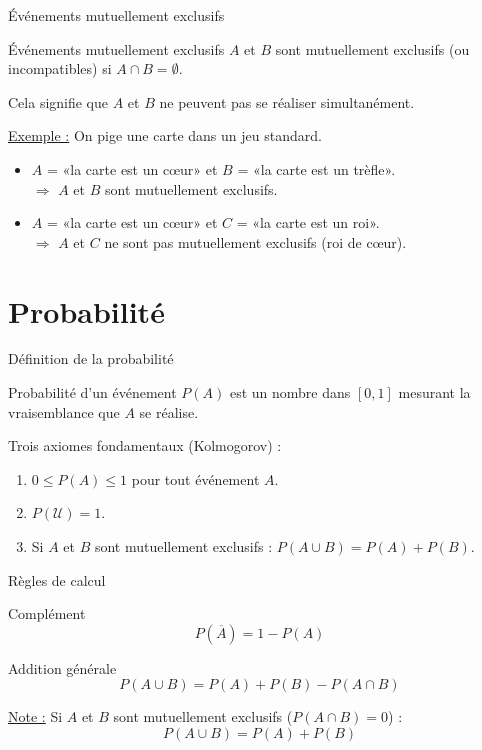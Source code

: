 \documentclass{BeamerTemplate}
\begin{document}
\begin{frame}[t]{Événements mutuellement exclusifs}

\begin{Boite}{Événements mutuellement exclusifs}
$A$ et $B$ sont mutuellement exclusifs (ou incompatibles) si $A \cap B = \emptyset$.
\end{Boite}

\medskip
Cela signifie que $A$ et $B$ \alert{ne peuvent pas se réaliser simultanément}.

\bigskip
\underline{Exemple :} On pige une carte dans un jeu standard.
\begin{itemize}\itemsep3mm
  \item $A$ = «la carte est un cœur» et $B$ = «la carte est un trèfle».\\
  $\Rightarrow$ $A$ et $B$ sont mutuellement exclusifs.
  \item $A$ = «la carte est un cœur» et $C$ = «la carte est un roi».\\
  $\Rightarrow$ $A$ et $C$ ne sont pas mutuellement exclusifs (roi de cœur).
\end{itemize}

\end{frame}

\section{Probabilité}

\begin{frame}[t]{Définition de la probabilité}

\begin{Boite}{Probabilité d'un événement}
$P(A)$ est un nombre dans $[0, 1]$ mesurant la \alert{vraisemblance} que $A$ se réalise.
\end{Boite}

\medskip
Trois axiomes fondamentaux (Kolmogorov) :
\begin{enumerate}\itemsep4mm
  \item $0 \le P(A) \le 1$ pour tout événement $A$.
  \item $P(\mathcal{U}) = 1$.
  \item Si $A$ et $B$ sont mutuellement exclusifs : $P(A \cup B) = P(A) + P(B)$.
\end{enumerate}

\end{frame}

\begin{frame}[t]{Règles de calcul}

\begin{Boite}{Complément}
$$P(\overline{A}) = 1 - P(A)$$
\end{Boite}

\begin{Boite}{Addition générale}
$$P(A \cup B) = P(A) + P(B) - P(A \cap B)$$
\end{Boite}

\medskip
\underline{Note :} Si $A$ et $B$ sont mutuellement exclusifs ($P(A \cap B) = 0$) :
$$P(A \cup B) = P(A) + P(B)$$

\end{frame}
\end{document}
